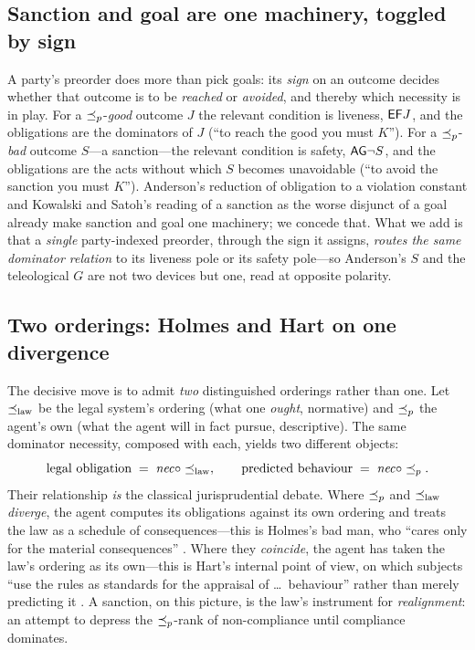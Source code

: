 \subsection{Sanction and goal are one machinery, toggled by sign}
\label{sec:duality}

A party's preorder does more than pick goals: its \emph{sign} on an outcome decides
whether that outcome is to be \emph{reached} or \emph{avoided}, and thereby which
necessity is in play. For a $\preceq_{p}$-\emph{good} outcome $J$ the relevant condition is
liveness, $\mathsf{EF} J$, and the obligations are the dominators of $J$ (``to reach the good you
must $K$''). For a $\preceq_{p}$-\emph{bad} outcome $S$---a sanction---the relevant condition
is safety, $\mathsf{AG}\neg S$, and the obligations are the acts without which $S$ becomes
unavoidable (``to avoid the sanction you must $K$''). Anderson's reduction of obligation
to a violation constant  and Kowalski and Satoh's reading of a
sanction as the worse disjunct of a goal  already make
sanction and goal one machinery; we concede that. What we add is that a \emph{single}
party-indexed preorder, through the sign it assigns, \emph{routes the same dominator
relation} to its liveness pole or its safety pole---so Anderson's $S$ and the
teleological $G$ are not two devices but one, read at opposite polarity.

\subsection{Two orderings: Holmes and Hart on one divergence}
\label{sec:holmeshart}

The decisive move is to admit \emph{two} distinguished orderings rather than one. Let
$\preceq_{\mathrm{law}}$ be the legal system's ordering (what one \emph{ought}, normative) and $\preceq_{p}$
the agent's own (what the agent will in fact pursue, descriptive). The same dominator
necessity, composed with each, yields two different objects:
\[
  \text{legal obligation} \;=\; \mathit{nec}\circ\preceq_{\mathrm{law}},
  \qquad
  \text{predicted behaviour} \;=\; \mathit{nec}\circ\preceq_{p} .
\]
Their relationship \emph{is} the classical jurisprudential debate. Where $\preceq_{p}$ and
$\preceq_{\mathrm{law}}$ \emph{diverge}, the agent computes its obligations against its own ordering and
treats the law as a schedule of consequences---this is Holmes's bad man, who ``cares
only for the material consequences'' . Where they \emph{coincide}, the
agent has taken the law's ordering as its own---this is Hart's internal point of view, on
which subjects ``use the rules as standards for the appraisal of \dots\ behaviour''
rather than merely predicting it . A sanction, on this picture, is the
law's instrument for \emph{realignment}: an attempt to depress the $\preceq_{p}$-rank of
non-compliance until compliance dominates.

